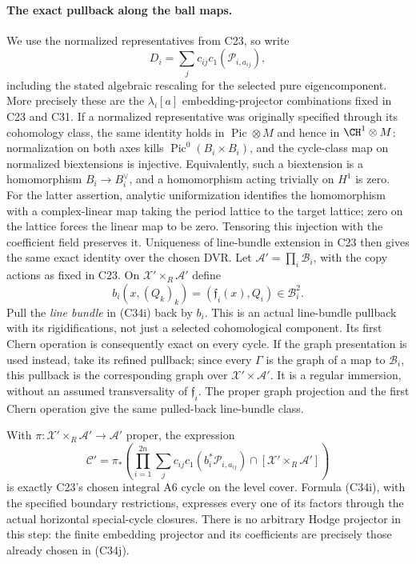\documentclass[11pt]{article}
\theoremstyle{definition}\newtheorem{definition}[theorem]{Definition}\newtheorem{remark}[theorem]{Remark}
\begin{document}
\paragraph{The exact pullback along the ball maps.}
We use the normalized representatives
from C23, so write
\[
 D_i=\sum_j c_{ij}c_1(\mathcal P_{i,a_{ij}}),
                                                        \tag{C34j}
\]
including the stated algebraic
rescaling for the selected pure
eigencomponent. More precisely these
are the $\lambda_i[a]$ embedding-projector
combinations fixed in C23 and C31.
If a normalized representative was
originally specified through its
cohomology class, the same identity
holds in $\operatorname{Pic}\otimes M$
and hence in $\CH^1\otimes M$:
normalization on both axes kills
$\operatorname{Pic}^0(B_i\times B_i)$,
and the cycle-class map on normalized
biextensions is injective. Equivalently,
such a biextension is a homomorphism
$B_i\to B_i^\vee$, and a homomorphism
acting trivially on $H^1$ is zero.
For the latter assertion, analytic
uniformization identifies the
homomorphism with a complex-linear
map taking the period lattice to the
target lattice; zero on the lattice
forces the linear map to be zero.
Tensoring this injection with the
coefficient field preserves it.
Uniqueness of line-bundle extension
in C23 then gives the same exact
identity over the chosen DVR.
Let
$\mathcal A'=\prod_i\mathcal B_i$,
with the copy actions as fixed in
C23. On
$\mathcal X'\times_R\mathcal A'$
define
\[
 b_i(x,(Q_k)_k)=(\mathfrak f_i(x),Q_i)
                         \in\mathcal B_i^2.
                                                        \tag{C34k}
\]
Pull the \emph{line bundle} in (C34i)
back by $b_i$. This is an actual
line-bundle pullback with its
rigidifications, not just a selected
cohomological component. Its first
Chern operation is consequently
exact on every cycle. If the graph
presentation is used instead, take
its refined pullback; since every
$\Gamma$ is the graph of a map to
$\mathcal B_i$, this pullback is the
corresponding graph over
$\mathcal X'\times\mathcal A'$.
It is a regular immersion, without
an assumed transversality of
$\mathfrak f_i$. The proper graph
projection and the first Chern
operation give the same pulled-back
line-bundle class.

With $\pi:\mathcal X'\times_R\mathcal A'
\to\mathcal A'$ proper, the expression
\[
 \mathcal C'=\pi_*\left(
       \prod_{i=1}^{2n}
         \sum_jc_{ij}c_1(b_i^*\mathcal P_{i,a_{ij}})
       \cap[\mathcal X'\times_R\mathcal A']\right)
                                                        \tag{C34l}
\]
is exactly C23's chosen integral
A6 cycle on the level cover. Formula
(C34i), with the specified boundary
restrictions, expresses every one of
its factors through the actual
horizontal special-cycle closures.
There is no arbitrary Hodge projector
in this step: the finite embedding
projector and its coefficients are
precisely those already chosen in
(C34j).
\end{document}
